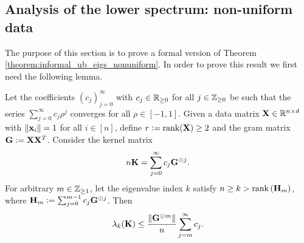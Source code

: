 \subsection{Analysis of the lower spectrum: non-uniform data}\label{appendix:lower_non_uniform}
The purpose of this section is to prove a formal version of Theorem \ref{theorem:informal_ub_eigs_nonuniform}. In order to prove this result we first need the following lemma.

\begin{lemma}\label{lemma:eigen_ub_nonuniform1}
     Let the coefficients $(c_j)_{j=0}^\infty$ with $c_j \in \mathbb{R}_{\geq 0}$ for all $j \in \mathbb{Z}_{\geq 0}$ be such that the series $\sum_{j=0}^{\infty} c_j \rho^j$ converges for all $\rho \in [-1,1]$. Given a data matrix $\mathbf{X} \in \mathbb{R}^{n \times d}$ with $\left\lVert\mathbf x_i\right\rVert = 1$ for all $i \in [n]$, define $r \vcentcolon= \operatorname{rank}(\mathbf{X}) \geq 2$ and the gram matrix $\mathbf{G}\vcentcolon= \mathbf{X} \mathbf{X}^T$. Consider the kernel matrix
    \[
        n\mathbf{K} = \sum_{j=0}^{\infty}c_j \mathbf{G}^{\odot j} . 
    \]
    For arbitrary $m \in \mathbb{Z}_{\geq 1}$, let the eigenvalue index $k$ satisfy $n \geq k > \operatorname{rank} \left( \mathbf{H}_m \right)$, where $\mathbf{H}_m \vcentcolon= \sum_{j=0}^{m-1} c_j \mathbf{G}^{\odot j}$. Then
    \begin{equation} \label{eq:eig_ub1_nonuniform}
        \lambda_k(\mathbf{K}) \leq \frac{\left\lVert\mathbf{G}^{\odot m}\right\rVert}{n} \sum_{j=m}^{\infty} c_j.
    \end{equation}
\end{lemma}
